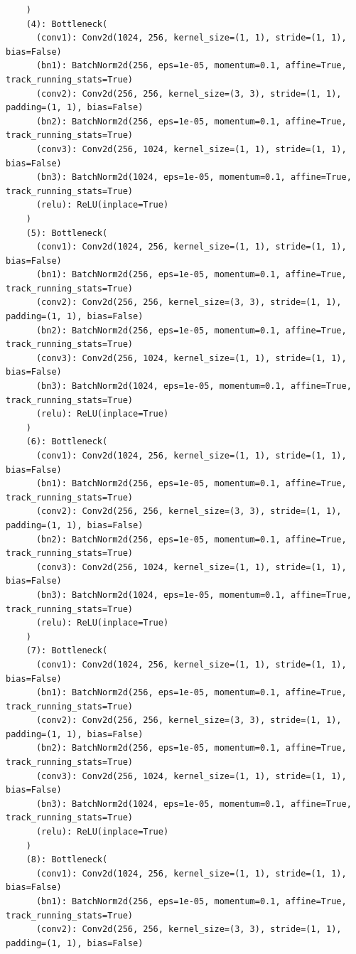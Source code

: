\documentclass{article}
\begin{document}
\begin{verbatim}
    )
    (4): Bottleneck(
      (conv1): Conv2d(1024, 256, kernel_size=(1, 1), stride=(1, 1), bias=False)
      (bn1): BatchNorm2d(256, eps=1e-05, momentum=0.1, affine=True, track_running_stats=True)
      (conv2): Conv2d(256, 256, kernel_size=(3, 3), stride=(1, 1), padding=(1, 1), bias=False)
      (bn2): BatchNorm2d(256, eps=1e-05, momentum=0.1, affine=True, track_running_stats=True)
      (conv3): Conv2d(256, 1024, kernel_size=(1, 1), stride=(1, 1), bias=False)
      (bn3): BatchNorm2d(1024, eps=1e-05, momentum=0.1, affine=True, track_running_stats=True)
      (relu): ReLU(inplace=True)
    )
    (5): Bottleneck(
      (conv1): Conv2d(1024, 256, kernel_size=(1, 1), stride=(1, 1), bias=False)
      (bn1): BatchNorm2d(256, eps=1e-05, momentum=0.1, affine=True, track_running_stats=True)
      (conv2): Conv2d(256, 256, kernel_size=(3, 3), stride=(1, 1), padding=(1, 1), bias=False)
      (bn2): BatchNorm2d(256, eps=1e-05, momentum=0.1, affine=True, track_running_stats=True)
      (conv3): Conv2d(256, 1024, kernel_size=(1, 1), stride=(1, 1), bias=False)
      (bn3): BatchNorm2d(1024, eps=1e-05, momentum=0.1, affine=True, track_running_stats=True)
      (relu): ReLU(inplace=True)
    )
    (6): Bottleneck(
      (conv1): Conv2d(1024, 256, kernel_size=(1, 1), stride=(1, 1), bias=False)
      (bn1): BatchNorm2d(256, eps=1e-05, momentum=0.1, affine=True, track_running_stats=True)
      (conv2): Conv2d(256, 256, kernel_size=(3, 3), stride=(1, 1), padding=(1, 1), bias=False)
      (bn2): BatchNorm2d(256, eps=1e-05, momentum=0.1, affine=True, track_running_stats=True)
      (conv3): Conv2d(256, 1024, kernel_size=(1, 1), stride=(1, 1), bias=False)
      (bn3): BatchNorm2d(1024, eps=1e-05, momentum=0.1, affine=True, track_running_stats=True)
      (relu): ReLU(inplace=True)
    )
    (7): Bottleneck(
      (conv1): Conv2d(1024, 256, kernel_size=(1, 1), stride=(1, 1), bias=False)
      (bn1): BatchNorm2d(256, eps=1e-05, momentum=0.1, affine=True, track_running_stats=True)
      (conv2): Conv2d(256, 256, kernel_size=(3, 3), stride=(1, 1), padding=(1, 1), bias=False)
      (bn2): BatchNorm2d(256, eps=1e-05, momentum=0.1, affine=True, track_running_stats=True)
      (conv3): Conv2d(256, 1024, kernel_size=(1, 1), stride=(1, 1), bias=False)
      (bn3): BatchNorm2d(1024, eps=1e-05, momentum=0.1, affine=True, track_running_stats=True)
      (relu): ReLU(inplace=True)
    )
    (8): Bottleneck(
      (conv1): Conv2d(1024, 256, kernel_size=(1, 1), stride=(1, 1), bias=False)
      (bn1): BatchNorm2d(256, eps=1e-05, momentum=0.1, affine=True, track_running_stats=True)
      (conv2): Conv2d(256, 256, kernel_size=(3, 3), stride=(1, 1), padding=(1, 1), bias=False)

\end{verbatim}
\end{document}
